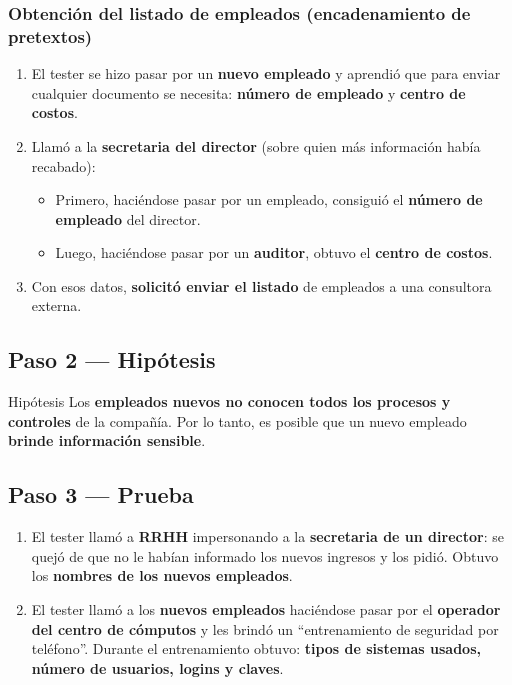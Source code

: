 \documentclass[11pt,a4paper]{article}
\begin{document}
\subsubsection*{Obtención del listado de empleados (encadenamiento de pretextos)}
\begin{enumerate}[leftmargin=1.8em,itemsep=2pt]
  \item El tester se hizo pasar por un \textbf{nuevo empleado} y aprendió que para enviar
        cualquier documento se necesita: \textbf{número de empleado} y \textbf{centro de
        costos}.
  \item Llamó a la \textbf{secretaria del director} (sobre quien más información había
        recabado):
  \begin{itemize}[leftmargin=1.4em,itemsep=1pt]
    \item Primero, haciéndose pasar por un empleado, consiguió el \textbf{número de empleado}
          del director.
    \item Luego, haciéndose pasar por un \textbf{auditor}, obtuvo el \textbf{centro de costos}.
  \end{itemize}
  \item Con esos datos, \textbf{solicitó enviar el listado} de empleados a una consultora
        externa.
\end{enumerate}

\subsection{Paso 2 — Hipótesis}

\begin{defbox}{Hipótesis}
Los \textbf{empleados nuevos no conocen todos los procesos y controles} de la compañía. Por lo
tanto, es posible que un nuevo empleado \textbf{brinde información sensible}.
\end{defbox}

\subsection{Paso 3 — Prueba}

\begin{enumerate}[leftmargin=1.8em,itemsep=3pt]
  \item El tester llamó a \textbf{RRHH} impersonando a la \textbf{secretaria de un director}:
        se quejó de que no le habían informado los nuevos ingresos y los pidió. Obtuvo los
        \textbf{nombres de los nuevos empleados}.
  \item El tester llamó a los \textbf{nuevos empleados} haciéndose pasar por el
        \textbf{operador del centro de cómputos} y les brindó un ``entrenamiento de seguridad
        por teléfono''. Durante el entrenamiento obtuvo: \textbf{tipos de sistemas usados,
        número de usuarios, logins y claves}.
\end{enumerate}
\end{document}
